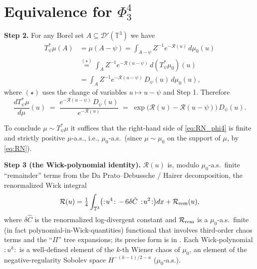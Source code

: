 \section*{Equivalence for $\Phi^4_3$}

\textbf{Step 2.}  For any Borel set $A\subseteq\mathcal D'(\mathbb T^3)$ we have
\begin{align*}
T_\psi^*\mu(A) &= \mu(A-\psi) = \int_{A-\psi} Z^{-1}e^{-\mathcal R(u)}\,d\mu_0(u)\\
&\stackrel{(\star)}{=} \int_A Z^{-1}e^{-\mathcal R(u-\psi)}\,d(T_\psi^*\mu_0)(u)\\
&= \int_A Z^{-1}e^{-\mathcal R(u-\psi)}\,D_\psi(u)\,d\mu_0(u),
\end{align*}
where $(\star)$ uses the change of variables $u\mapsto u-\psi$ and Step 1.  Therefore
\begin{equation}\label{eq:RN_phi4}
\frac{dT_\psi^*\mu}{d\mu}(u)
\;=\;\frac{e^{-\mathcal R(u-\psi)}\,D_\psi(u)}{e^{-\mathcal R(u)}}
\;=\;\exp\bigl(\mathcal R(u)-\mathcal R(u-\psi)\bigr)\,D_\psi(u).
\end{equation}

To conclude $\mu\sim T_\psi^*\mu$ it suffices that the right-hand side of \eqref{eq:RN_phi4} is finite and strictly positive $\mu$-a.s., i.e., $\mu_0$-a.s.\ (since $\mu\sim\mu_0$ on the support of $\mu$, by \eqref{eq:RN}).

\textbf{Step 3 (the Wick-polynomial identity).}  $\mathcal R(u)$ is, modulo $\mu_0$-a.s.\ finite ``remainder'' terms from the Da Prato--Debussche / Hairer decomposition, the renormalized Wick integral
\[
\mathcal R(u) = \tfrac14\int_{\mathbb T^3}\bigl(:\!u^4\!:\,-\,6\delta\hat C\,:\!u^2\!:\bigr)dx + \mathcal R_{\rm rem}(u),
\]
where $\delta\hat C$ is the renormalized log-divergent constant and $\mathcal R_{\rm rem}$ is a $\mu_0$-a.s.\ finite (in fact polynomial-in-Wick-quantities) functional that involves third-order chaos terms and the ``$\Pi$'' tree expansions; its precise form is in \cite[\S 9]{Hairer14}.  Each Wick-polynomial $:\!u^k\!:$ is a well-defined element of the $k$-th Wiener chaos of $\mu_0$, an element of the negative-regularity Sobolev space $H^{-(k-1)/2-\kappa}$ ($\mu_0$-a.s.).

